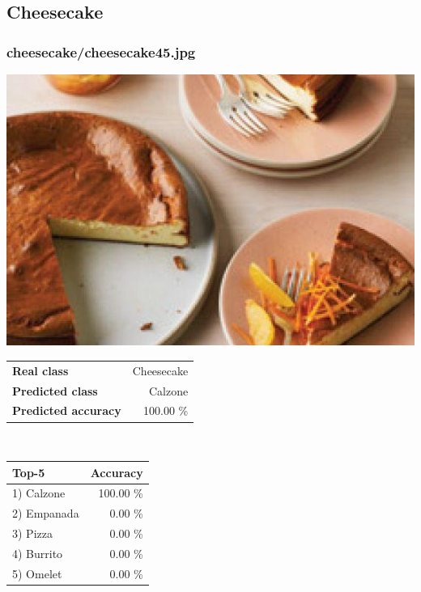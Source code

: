 \subsection{Cheesecake}
    
\subsubsection{cheesecake/cheesecake45.jpg}

\begin{minipage}[t]{0.4\textwidth}
	\vspace{0pt}
	\includegraphics[width=\linewidth]{images/evaluation-images/cheesecake/cheesecake45.jpg}
\end{minipage}
\hfill
\begin{minipage}[t]{0.5\textwidth}
	\vspace{0pt}\raggedright
	\begin{tabularx}{\textwidth}{X r}
		\small \textbf{Real class} & \small Cheesecake\\
		\small \textbf{Predicted class} & \small Calzone\\
		\small \textbf{Predicted accuracy} & \small 100.00 \%
    \end{tabularx}\\
    
    \vspace{6pt}
	\begin{tabularx}{\textwidth}{X r}
        \small \textbf{Top-5} & \small \textbf{Accuracy} \\
        \hline
		\small 1) Calzone & \small 100.00 \%\\\small 2) Empanada & \small 0.00 \%\\\small 3) Pizza & \small 0.00 \%\\\small 4) Burrito & \small 0.00 \%\\\small 5) Omelet & \small 0.00 \%
    \end{tabularx}
\end{minipage}
    
